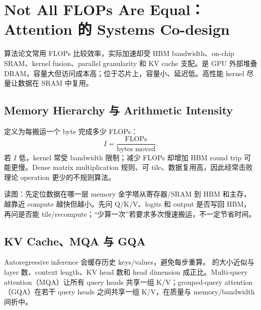 \section{Not All FLOPs Are Equal：Attention 的 Systems Co-design}

算法论文常用 FLOPs 比较效率，实际加速却受 HBM bandwidth、on-chip SRAM、kernel fusion、parallel granularity 和 KV cache 支配。是 GPU 外部堆叠 DRAM，容量大但访问成本高；位于芯片上，容量小、延迟低。高性能 kernel 尽量让数据在 SRAM 中复用。

\subsection{Memory Hierarchy 与 Arithmetic Intensity}

定义为每搬运一个 byte 完成多少 FLOPs：
\[
I=\frac{\text{FLOPs}}{\text{bytes moved}}.
\]
若 $I$ 低，kernel 常受 bandwidth 限制；减少 FLOPs 却增加 HBM round trip 可能更慢。Dense matrix multiplication 规则、可 tile、数据复用高，因此经常击败理论 operation 更少的不规则算法。


\begin{knowledgebox}{读图：先定位数据在哪一层 memory}
金字塔从寄存器/SRAM 到 HBM 和主存，越靠近 compute 越快但越小。先问 Q/K/V、logits 和 output 是否写回 HBM，再问是否能 tile/recompute；“少算一次”若要求多次慢速搬运，不一定节省时间。
\end{knowledgebox}


\subsection{KV Cache、MQA 与 GQA}

Autoregressive inference 会缓存历史 keys/values，避免每步重算。 的大小近似与 layer 数、context length、KV head 数和 head dimension 成正比。Multi-query attention（MQA）让所有 query heads 共享一组 K/V；grouped-query attention（GQA）在若干 query heads 之间共享一组 K/V，在质量与 memory/bandwidth 间折中。

